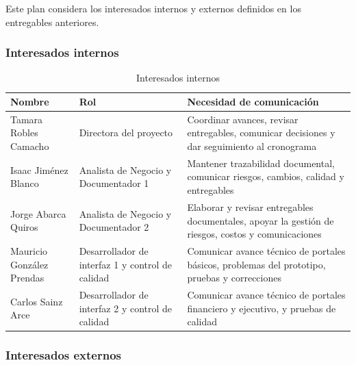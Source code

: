 \documentclass[11pt,spanish]{article}
\begin{document}
Este plan considera los interesados internos y externos definidos en los entregables anteriores.

\subsubsection{Interesados internos}

\begin{table}[H]
\centering
\caption{Interesados internos}
\label{tab:stakeholders-internos}
{\small
\begin{tabularx}{\textwidth}{p{3.7cm} p{4.1cm} Y}
\toprule
\textbf{Nombre} & \textbf{Rol} & \textbf{Necesidad de comunicación} \\
\midrule
Tamara Robles Camacho & Directora del proyecto & Coordinar avances, revisar entregables, comunicar decisiones y dar seguimiento al cronograma \\
Isaac Jiménez Blanco & Analista de Negocio y Documentador 1 & Mantener trazabilidad documental, comunicar riesgos, cambios, calidad y entregables \\
Jorge Abarca Quiros & Analista de Negocio y Documentador 2 & Elaborar y revisar entregables documentales, apoyar la gestión de riesgos, costos y comunicaciones \\
Mauricio González Prendas & Desarrollador de interfaz 1 y control de calidad & Comunicar avance técnico de portales básicos, problemas del prototipo, pruebas y correcciones \\
Carlos Sainz Arce & Desarrollador de interfaz 2 y control de calidad & Comunicar avance técnico de portales financiero y ejecutivo, y pruebas de calidad \\
\bottomrule
\end{tabularx}
}
\end{table}

\subsubsection{Interesados externos}
\end{document}

